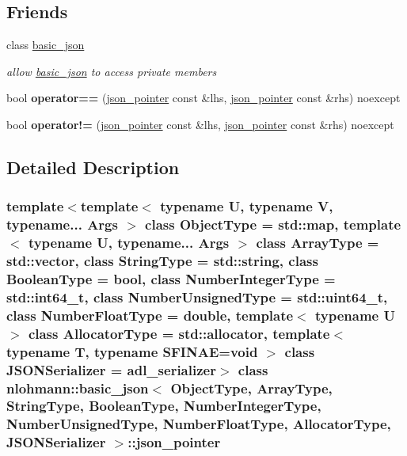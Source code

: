 \subsection*{Friends}
\begin{DoxyCompactItemize}
\item 
\mbox{\label{classnlohmann_1_1basic__json_1_1json__pointer_ada3100cdb8700566051828f1355fa745}} 
class \hyperlink{classnlohmann_1_1basic__json_1_1json__pointer_ada3100cdb8700566051828f1355fa745}{basic\+\_\+json}
\begin{DoxyCompactList}\small\item\em allow \hyperlink{classnlohmann_1_1basic__json}{basic\+\_\+json} to access private members \end{DoxyCompactList}\item 
\mbox{\label{classnlohmann_1_1basic__json_1_1json__pointer_a4667ef558c8c3f8a646bfda0c6654653}} 
bool {\bfseries operator==} (\hyperlink{classnlohmann_1_1basic__json_1_1json__pointer}{json\+\_\+pointer} const \&lhs, \hyperlink{classnlohmann_1_1basic__json_1_1json__pointer}{json\+\_\+pointer} const \&rhs) noexcept
\item 
\mbox{\label{classnlohmann_1_1basic__json_1_1json__pointer_a6779edcf28e6f018a3bbb29c0b4b5e1e}} 
bool {\bfseries operator!=} (\hyperlink{classnlohmann_1_1basic__json_1_1json__pointer}{json\+\_\+pointer} const \&lhs, \hyperlink{classnlohmann_1_1basic__json_1_1json__pointer}{json\+\_\+pointer} const \&rhs) noexcept
\end{DoxyCompactItemize}


\subsection{Detailed Description}
\subsubsection*{template$<$template$<$ typename U, typename V, typename... Args $>$ class Object\+Type = std\+::map, template$<$ typename U, typename... Args $>$ class Array\+Type = std\+::vector, class String\+Type = std\+::string, class Boolean\+Type = bool, class Number\+Integer\+Type = std\+::int64\+\_\+t, class Number\+Unsigned\+Type = std\+::uint64\+\_\+t, class Number\+Float\+Type = double, template$<$ typename U $>$ class Allocator\+Type = std\+::allocator, template$<$ typename T, typename S\+F\+I\+N\+A\+E=void $>$ class J\+S\+O\+N\+Serializer = adl\+\_\+serializer$>$\newline
class nlohmann\+::basic\+\_\+json$<$ Object\+Type, Array\+Type, String\+Type, Boolean\+Type, Number\+Integer\+Type, Number\+Unsigned\+Type, Number\+Float\+Type, Allocator\+Type, J\+S\+O\+N\+Serializer $>$\+::json\+\_\+pointer}

